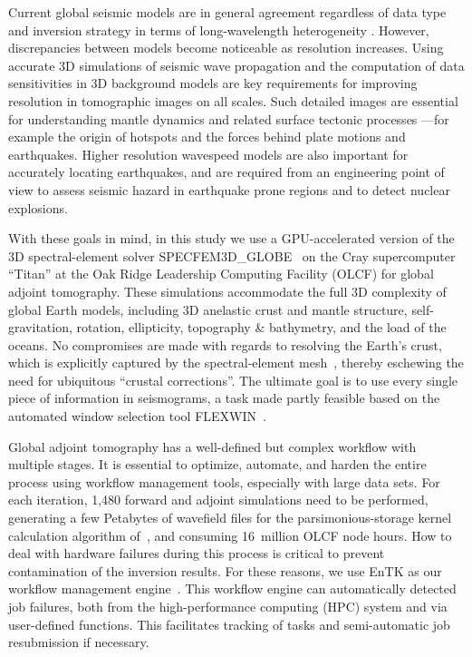 Current global seismic models are in general agreement regardless of data type and inversion strategy in terms of long-wavelength heterogeneity \cite{ritzwollerlavely1995,TW01,beckerboschi2002}.
However, discrepancies between models become noticeable as resolution increases.
Using accurate 3D simulations of seismic wave propagation and the computation of data sensitivities in 3D background models are key requirements for improving resolution in tomographic images on all scales.
Such detailed images are essential for understanding mantle dynamics and related surface tectonic processes
---for example the origin of hotspots and the forces behind plate motions and earthquakes.
Higher resolution wavespeed models are also important for accurately locating earthquakes, and are required from an engineering point of view to assess seismic hazard in earthquake prone regions and to detect nuclear explosions. 

With these goals in mind,
in this study we use a GPU-accelerated version of the 3D spectral-element solver
SPECFEM3D\_GLOBE~\cite{KoTr02a,KoTr02b} on the Cray supercomputer ``Titan'' at the Oak Ridge Leadership Computing Facility (OLCF) for global adjoint tomography.
These simulations accommodate the full 3D complexity of global Earth models,
including 3D anelastic crust and mantle structure, self-gravitation, rotation, ellipticity, topography \& bathymetry, and the load of the oceans.
No compromises are made with regards to resolving the Earth's crust,
which is explicitly captured by the spectral-element mesh~\cite{tromp2010a},
thereby eschewing the need for ubiquitous ``crustal corrections''.
The ultimate goal is to use every single piece of information in seismograms,
a task made partly feasible based on the automated window selection tool FLEXWIN~\cite{maggi2009automated}.

Global adjoint tomography has a well-defined but complex workflow with multiple stages.
It is essential to optimize, automate, and harden the entire process using workflow management tools, especially with large data sets.
For each iteration,
1,480 forward and adjoint simulations need to be performed,
generating a few Petabytes of wavefield files for the parsimonious-storage kernel calculation algorithm of~\cite{KoXiBoPeSaLiTr16}, and consuming 16~million OLCF node hours.
How to deal with hardware failures during this process is critical
to prevent contamination of the inversion results.
For these reasons, we use EnTK as our
workflow management engine~\cite{EnTK2017}.
This workflow engine can automatically detected job failures,
both from the high-performance computing (HPC) system and via user-defined functions.
This facilitates tracking of tasks and semi-automatic job resubmission if necessary.

